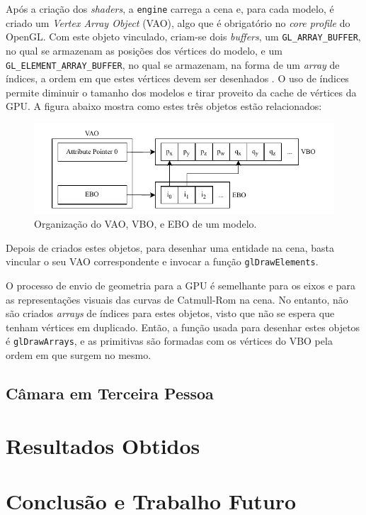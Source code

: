 \documentclass[12pt, a4paper]{article}
\begin{document}
Após a criação dos \emph{shaders}, a \texttt{engine} carrega a cena e, para cada modelo, é criado um
\emph{Vertex Array Object} (VAO), algo que é obrigatório no \emph{core profile} do OpenGL. Com este
objeto vinculado, criam-se dois \emph{buffers}, um \texttt{GL\_ARRAY\_BUFFER}, no qual se armazenam
as posições dos vértices do modelo, e um \texttt{GL\_ELEMENT\_ARRAY\_BUFFER}, no qual se armazenam,
na forma de um \emph{array} de índices, a ordem em que estes vértices devem ser desenhados
\cite{glBufferData}. O uso de índices permite diminuir o tamanho dos modelos e tirar proveito da
cache de vértices da GPU. A figura abaixo mostra como estes três objetos estão relacionados:

\begin{figure}[H]
    \centering
    \includegraphics[width=\textwidth]{res/phase3/VAO.pdf}
    \caption{Organização do VAO, VBO, e EBO de um modelo.}
\end{figure}

Depois de criados estes objetos, para desenhar uma entidade na cena, basta vincular o seu VAO
correspondente e invocar a função \texttt{glDrawElements}.

O processo de envio de geometria para a GPU é semelhante para os eixos e para as representações
visuais das curvas de Catmull-Rom na cena. No entanto, não são criados \emph{arrays} de índices para
estes objetos, visto que não se espera que tenham vértices em duplicado. Então, a função usada para
desenhar estes objetos é \texttt{glDrawArrays}, e as primitivas são formadas com os vértices do VBO
pela ordem em que surgem no mesmo.

\subsection{Câmara em Terceira Pessoa}

\section{Resultados Obtidos}

\section{Conclusão e Trabalho Futuro}
\end{document}
